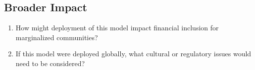 \documentclass[12pt]{article}
\begin{document}
	\subsection*{Broader Impact}
	\begin{enumerate}
		\item How might deployment of this model impact financial inclusion for marginalized communities?
		\item If this model were deployed globally, what cultural or regulatory issues would need to be considered?
	\end{enumerate}
	
\end{document}

